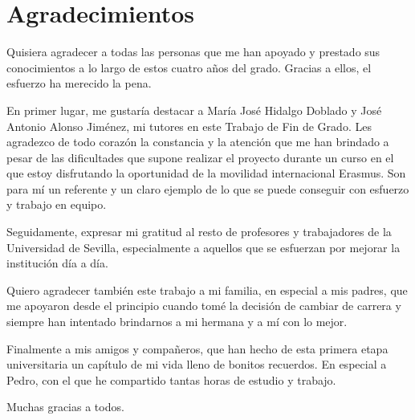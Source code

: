 \chapter*{Agradecimientos}

Quisiera agradecer a todas las personas que me han apoyado y prestado
sus conocimientos a lo largo de estos cuatro años del grado. Gracias a ellos, 
el esfuerzo ha merecido la pena.

En primer lugar, me gustaría destacar a María José Hidalgo Doblado y José 
Antonio Alonso Jiménez, mi tutores en este Trabajo de Fin de Grado. Les
agradezco de todo corazón la constancia y la atención que me han brindado 
a pesar de las dificultades que supone realizar el proyecto durante un
curso en el que estoy disfrutando la oportunidad de la movilidad internacional
Erasmus. Son para mí un referente y un claro ejemplo de lo que se puede 
conseguir con esfuerzo y trabajo en equipo.

Seguidamente, expresar mi gratitud al resto de profesores y trabajadores
de la Universidad de Sevilla, especialmente a aquellos que se esfuerzan 
por mejorar la institución día a día.

Quiero agradecer también este trabajo a mi familia, en especial a mis padres,
que me apoyaron desde el principio cuando tomé la decisión de cambiar de
carrera y siempre han intentado brindarnos a mi hermana y a mí con lo mejor.

Finalmente a mis amigos y compañeros, que han hecho de esta primera etapa 
universitaria un capítulo de mi vida lleno de bonitos recuerdos. En especial
a Pedro, con el que he compartido tantas horas de estudio y trabajo.

Muchas gracias a todos.
